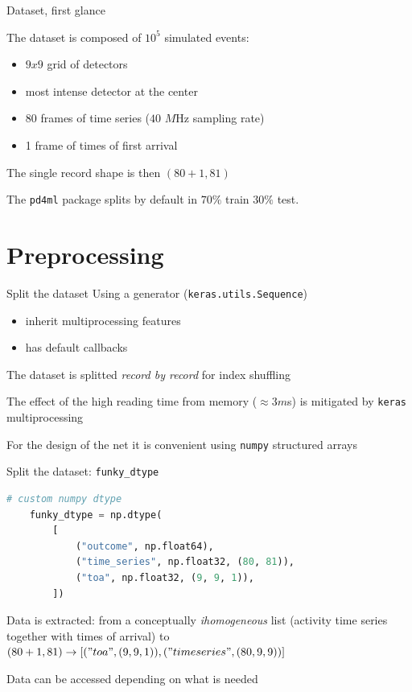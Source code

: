 \documentclass{beamer}
\begin{document}
\begin{frame}{Dataset, first glance}

    The dataset is composed of $10^5$ simulated events:

    \begin{itemize}
        \item $9 x 9$ grid of detectors
        \item most intense detector at the center 
        \item 80 frames of time series ($40$ $M$Hz sampling rate)
        \item 1 frame of times of first arrival 
    \end{itemize}

    The single record shape is then $(80 + 1 , 81)$

    The \texttt{pd4ml} package splits by default in $70\%$ train $30\%$ test.

\end{frame}


\section{Preprocessing}

\begin{frame}{Split the dataset}
    Using a generator (\texttt{keras.utils.Sequence})
    \begin{itemize}
        \item inherit multiprocessing features
        \item has default callbacks
    \end{itemize}
    The dataset is splitted \emph{record by record} for index shuffling

    The effect of the high reading time from memory ($\approx 3 m$s) is mitigated
    by \texttt{keras} multiprocessing
    
    For the design of the net it is convenient using \texttt{numpy} structured arrays
\end{frame}

\begin{frame}[fragile]{Split the dataset: \texttt{funky\_dtype}}

    
    \begin{lstlisting}[language=Python]
    # custom numpy dtype
    funky_dtype = np.dtype(
        [
            ("outcome", np.float64),
            ("time_series", np.float32, (80, 81)),
            ("toa", np.float32, (9, 9, 1)),
        ])
    \end{lstlisting}
    

    Data is extracted: from a conceptually \emph{ihomogeneous} list 
    (activity time series together with times of arrival) to
    $(80 + 1, 81) \rightarrow [("toa", (9, 9, 1)), ("timeseries", (80, 9,9))]$

    Data can be accessed depending on what is needed

\end{frame}
\end{document}
